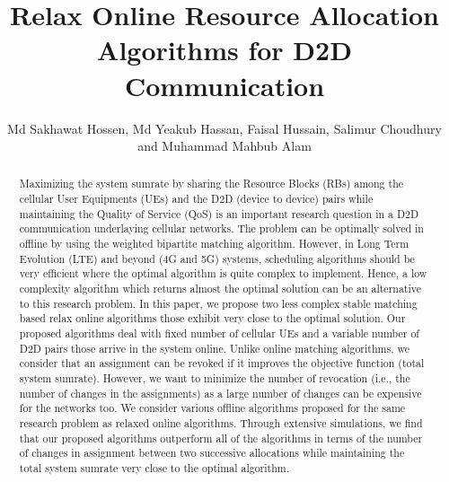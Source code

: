 \documentclass[times]{dacauth}
\begin{document}

\title{Relax Online Resource Allocation Algorithms for D2D Communication}

\author{Md Sakhawat Hossen, Md Yeakub Hassan, Faisal Hussain, Salimur Choudhury and Muhammad Mahbub Alam}

\address{Department of Computer Science and Engineering, IUT, Dhaka, Bangladesh and Department of Computer Science, Lakehead University, Thunder Bay, Ontario, Canada}


\vspace {-0.5cm}
\begin{abstract}

\noindent 
Maximizing the system sumrate by sharing the Resource Blocks (RBs) among the cellular User Equipments (UEs) and the D2D (device to device) pairs while maintaining the Quality of Service (QoS) is an important research question in a D2D communication underlaying cellular networks. The problem can be optimally solved in offline by using the weighted bipartite matching algorithm. However, in Long Term Evolution (LTE) and beyond (4G and 5G) systems, scheduling algorithms should be very efficient where the optimal algorithm is quite complex to implement. Hence, a low complexity algorithm which returns almost the optimal solution can be an alternative to this research problem. In this paper, we propose two less complex stable matching based relax online algorithms those exhibit very close to the optimal solution. Our proposed algorithms deal with fixed number of cellular UEs and a variable number of D2D pairs those arrive in the system online. Unlike online matching algorithms, we consider that an assignment can be revoked if it improves the objective function (total system sumrate). However, we want to minimize the number of revocation (i.e., the number of changes in the assignments) as a large number of changes can be expensive for the networks too. We consider various offline algorithms proposed for the same research problem as relaxed online algorithms. Through extensive simulations, we find that our proposed algorithms outperform all of the algorithms in terms of the number of changes in assignment between two successive allocations while maintaining the total system sumrate very close to the optimal algorithm.

\end{abstract}

\end{document}
